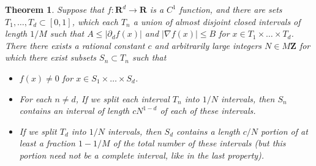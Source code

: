 \documentclass{report}
\theoremstyle{plain}
\theoremstyle{plain}
\newtheorem{theorem}{Theorem}
\begin{document}
\begin{theorem}
    Suppose that $f: \mathbf{R}^d \to \mathbf{R}$ is a $C^1$ function, and there are sets $T_1, \dots, T_d \subset [0,1]$, which each $T_n$ a union of almost disjoint closed intervals of length $1/M$ such that $A \leq |\partial_d f(x)|$ and $|\nabla f(x)| \leq B$ for $x \in T_1 \times \dots \times T_d$. There there exists a rational constant $c$ and arbitrarily large integers $N \in M \mathbf{Z}$ for which there exist subsets $S_n \subset T_n$ such that
    \begin{itemize}
        \item[(i)] $f(x) \neq 0$ for $x \in S_1 \times \dots \times S_d$.

        \item[(ii)] For each $n \neq d$, If we split each interval $T_n$ into $1/N$ intervals, then $S_n$ contains an interval of length $cN^{1-d}$ of each of these intervals.

        \item[(iii)] If we split $T_d$ into $1/N$ intervals, then $S_d$ contains a length $c/N$ portion of at least a fraction $1 - 1/M$ of the total number of these intervals (but this portion need not be a complete interval, like in the last property).
    \end{itemize}
\end{theorem}
\end{document}

